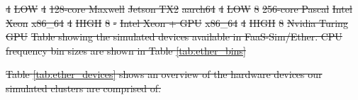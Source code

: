 \documentclass[draft,final]{vutinfth} %
\providecommand{\DIFdeltex}[1]{{\protect\color{red}\sout{#1}}}                      %
\providecommand{\DIFdelFL}[1]{\DIFdel{#1}} %
\providecommand{\DIFdel}[1]{\texorpdfstring{\DIFdeltex{#1}}{}} %
\begin{document}
\DIFdelFL{4                                                            }%
\DIFdelFL{LOW                                                         }%
\DIFdelFL{4                                                             }%
\DIFdelFL{128-core Maxwell        }%
\DIFdelFL{Jetson TX2                                                           }%
\DIFdelFL{aarch64                                                     }%
\DIFdelFL{4                                                            }%
\DIFdelFL{LOW                                                         }%
\DIFdelFL{8                                                             }%
\DIFdelFL{256-core Pascal        }%
\DIFdelFL{Intel Xeon                                                           }%
\DIFdelFL{x86\_64                                                     }%
\DIFdelFL{4                                                            }%
\DIFdelFL{HIGH                                                        }%
\DIFdelFL{8                                                             }%
\DIFdelFL{-                       }%
\DIFdelFL{Intel Xeon + GPU                                                      }%
\DIFdelFL{x86\_64                                                     }%
\DIFdelFL{4                                                            }%
\DIFdelFL{HIGH                                                        }%
\DIFdelFL{8                                                             }%
\DIFdelFL{Nvidia Turing GPU       }%
{%
\DIFdelFL{Table showing the simulated devices available in FaaS-Sim/Ether. CPU frequency bin sizes are shown in Table \ref{tab:ether_bins}}}

\DIFdel{Table \ref{tab:ether_devices} shows an overview of the hardware devices our simulated clusters are comprised of.
}%
\end{document}
